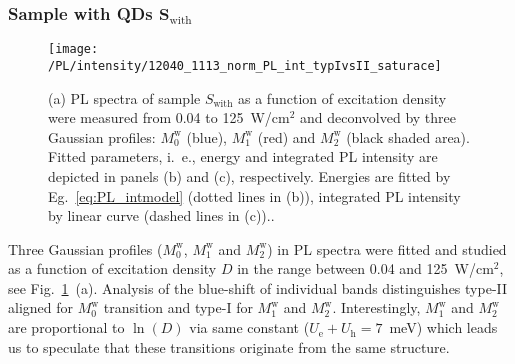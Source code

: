 \subsubsection*{Sample with QDs $\mathbf{S_\mathrm{with}}$}
\begin{figure}
	\centering
	\texttt{[image: /PL/intensity/12040\_1113\_norm\_PL\_int\_typIvsII\_saturace]}
	\caption{(a) PL spectra of sample $S_\mathrm{with}$ as a function of excitation density were measured from 0.04 to 125~W/cm$^2$ and deconvolved by three Gaussian profiles: $M_0^\mathrm{w}$ (blue), $M_1^\mathrm{w}$ (red) and $M_2^\mathrm{w}$ (black shaded area). Fitted parameters, i.~e., energy and integrated PL intensity are depicted in panels (b) and (c), respectively. Energies are fitted by Eg.~\ref{eq:PL_intmodel} (dotted lines in (b)), integrated PL intensity by linear curve (dashed lines in (c)).{}.}
	\label{fig:QD_w_int}
\end{figure}

Three Gaussian profiles ($M_0^\mathrm{w}$, $M_1^\mathrm{w}$ and $M_2^\mathrm{w}$) in PL spectra were fitted and studied as a function of excitation density $D$ in the range between 0.04 and 125~W/cm$^2$, see Fig.~\ref{fig:QD_w_int}~(a).
%
{}
%
%
 Analysis of the blue-shift of individual bands distinguishes type-II aligned for $M_0^\mathrm{w}$ transition and type-I for $M_1^\mathrm{w}$ and $M_2^\mathrm{w}$. Interestingly, $M_1^\mathrm{w}$ and $M_2^\mathrm{w}$ are proportional to $\ln(D)$ via same constant ($U_\mathrm{e}+U_\mathrm{h}=7$~meV) which leads us to speculate that these transitions originate from the same structure. 

